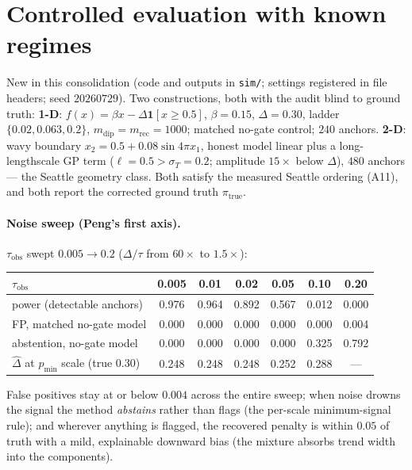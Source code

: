 \documentclass[11pt]{article}
\newcommand{\Ind}{\mathbf{1}}
\begin{document}
\section{Controlled evaluation with known regimes}
\label{sec:sim}

New in this consolidation (code and outputs in \texttt{sim/}; settings registered in file
headers; seed $20260729$). Two constructions, both with the audit blind to ground truth:
\textbf{1-D}: $f(x)=\beta x-\Delta\Ind[x\ge 0.5]$, $\beta=0.15$, $\Delta=0.30$, ladder
$\{0.02,0.063,0.2\}$, $m_{\mathrm{dip}}=m_{\mathrm{rec}}=1000$; matched no-gate control;
$240$ anchors. \textbf{2-D}: wavy boundary $x_2=0.5+0.08\sin 4\pi x_1$, honest model linear
plus a long-lengthscale GP term ($\ell=0.5>\sigma_T=0.2$; amplitude $15\times$ below
$\Delta$), $480$ anchors --- the Seattle geometry class. Both satisfy the measured Seattle
ordering (A11), and both report the corrected ground truth $\pi_{\mathrm{true}}$.

\paragraph{Noise sweep (Peng's first axis).} $\tau_{\mathrm{obs}}$ swept $0.005\to 0.2$
($\Delta/\tau$ from $60\times$ to $1.5\times$):

\begin{center}\small
\begin{tabular}{lcccccc}
\toprule
$\tau_{\mathrm{obs}}$ & 0.005 & 0.01 & 0.02 & 0.05 & 0.10 & 0.20\\
\midrule
power (detectable anchors)      & 0.976 & 0.964 & 0.892 & 0.567 & 0.012 & 0.000\\
FP, matched no-gate model       & 0.000 & 0.000 & 0.000 & 0.000 & 0.000 & 0.004\\
abstention, no-gate model       & 0.000 & 0.000 & 0.000 & 0.000 & 0.325 & 0.792\\
$\widehat\Delta$ at $p_{\min}$ scale (true $0.30$) & 0.248 & 0.248 & 0.248 & 0.252 & 0.288 & ---\\
\bottomrule
\end{tabular}
\end{center}

False positives stay at or below $0.004$ across the entire sweep; when noise drowns the
signal the method \emph{abstains} rather than flags (the per-scale minimum-signal rule); and
wherever anything is flagged, the recovered penalty is within $0.05$ of truth with a mild,
explainable downward bias (the mixture absorbs trend width into the components).
\end{document}
